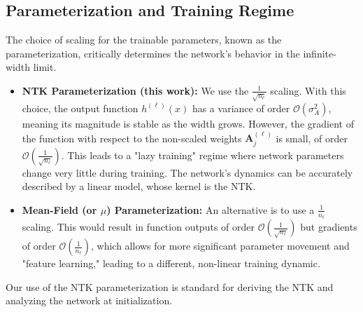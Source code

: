 \documentclass[12pt]{article}
\begin{document}
\subsection{Parameterization and Training Regime}
The choice of scaling for the trainable parameters, known as the parameterization, critically determines the network's behavior in the infinite-width limit.
\begin{itemize}
    \item \textbf{NTK Parameterization (this work):} We use the $\frac{1}{\sqrt{n_\ell}}$ scaling. With this choice, the output function $h^{(\ell)}(x)$ has a variance of order $\mathcal{O}(\sigma_A^2)$, meaning its magnitude is stable as the width grows. However, the gradient of the function with respect to the non-scaled weights $\bm{A}_j^{(\ell)}$ is small, of order $\mathcal{O}(\frac{1}{\sqrt{n_\ell}})$. This leads to a "lazy training" regime where network parameters change very little during training. The network's dynamics can be accurately described by a linear model, whose kernel is the NTK.
    \item \textbf{Mean-Field (or \(\mu\)) Parameterization:} An alternative is to use a $\frac{1}{n_\ell}$ scaling. This would result in function outputs of order $\mathcal{O}(\frac{1}{\sqrt{n_\ell}})$ but gradients of order $\mathcal{O}(\frac{1}{n_\ell})$, which allows for more significant parameter movement and "feature learning," leading to a different, non-linear training dynamic.
\end{itemize}
Our use of the NTK parameterization is standard for deriving the NTK and analyzing the network at initialization.
\end{document}
